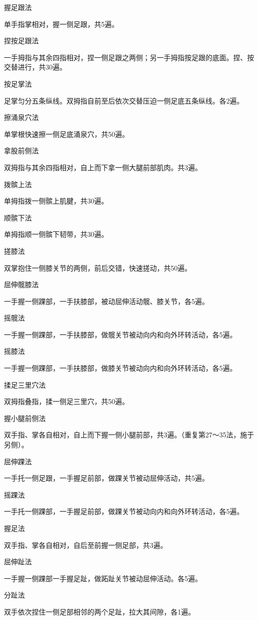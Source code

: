 \documentclass[12pt,UTF8,openany]{ctexbook}
\begin{document}
握足跟法

单手指掌相对，握一侧足跟，共5遍。

捏按足跟法

一手拇指与其余四指相对，捏一侧足跟之两侧；另一手拇指按足跟的底面。捏、按交替进行，共30遍。

按足掌法

足掌匀分五条纵线。双拇指自前至后依次交替压迫一侧足底五条纵线。各2遍。

擦涌泉穴法

单掌根快速擦一侧足底涌泉穴，共50遍。

拿股前侧法

双拇指与其余四指相对，自上而下拿一侧大腿前部肌肉。共3遍。

拨髌上法

单拇指拨一侧髌上肌腱，共30遍。

顺髌下法

单拇指顺一侧髌下韧带，共30遍。

搓膝法

双掌抱住一侧膝关节的两侧，前后交错，快速搓动，共50遍。

屈伸髋膝法

一手握一侧踝部，一手扶膝部，被动屈伸活动髋、膝关节，各5遍。

摇髋法

一手握一侧踝部，一手扶膝部，做髋关节被动向内和向外环转活动，各5遍。

摇膝法

一手握一侧踝部，一手扶膝部，做膝关节被动向内和向外环转活动，各5遍。

揉足三里穴法

双拇指叠指，揉一侧足三里穴，共50遍。

握小腿前侧法

双手指、掌各自相对，自上而下握一侧小腿前部，共3遍。（重复第27～35法，施于另侧）。

屈伸踝法

一手托一侧足跟，一手握足前部，做踝关节被动屈伸活动，共5遍。

摇踝法

一手托一侧踝部，一手握足前部，做踝关节被动向内和向外环转活动，各5遍。

握足法

双手指、掌各自相对，自后至前握一侧足部，共3遍。

屈伸趾法

一手握一侧踝部一手握足趾，做跖趾关节被动屈伸活动。各5遍。

分趾法

双手依次捏住一侧足部相邻的两个足趾，拉大其间隙，各1遍。
\end{document}
